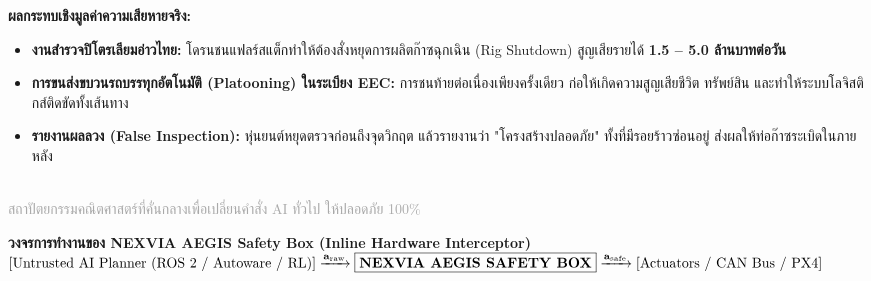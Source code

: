 \documentclass[11pt]{article}
\begin{document}
\vspace{3mm}
\begin{tcolorbox}[colback=lightbg,colframe=primary,arc=2mm,top=3mm,bottom=3mm]
  \textbf{\textcolor{primary}{ผลกระทบเชิงมูลค่าความเสียหายจริง:}}
  \begin{itemize}[leftmargin=5mm,itemsep=1mm]
    \item \textbf{งานสำรวจปิโตรเลียมอ่าวไทย:} โดรนชนแฟลร์สแต็กทำให้ต้องสั่งหยุดการผลิตก๊าซฉุกเฉิน (Rig Shutdown) สูญเสียรายได้ \textbf{1.5 -- 5.0 ล้านบาทต่อวัน}
    \item \textbf{การขนส่งขบวนรถบรรทุกอัตโนมัติ (Platooning) ในระเบียง EEC:} การชนท้ายต่อเนื่องเพียงครั้งเดียว ก่อให้เกิดความสูญเสียชีวิต ทรัพย์สิน และทำให้ระบบโลจิสติกส์ติดขัดทั้งเส้นทาง
    \item \textbf{รายงานผลลวง (False Inspection):} หุ่นยนต์หยุดตรวจก่อนถึงจุดวิกฤต แล้วรายงานว่า "โครงสร้างปลอดภัย" ทั้งที่มีรอยร้าวซ่อนอยู่ ส่งผลให้ท่อก๊าซระเบิดในภายหลัง
  \end{itemize}
\end{tcolorbox}

\clearpage

\noindent {\Large \textbf{\textcolor{primary}{03 \textbar\ นวัตกรรมของ NEXVIA AEGIS (The Dual-Shield Safety Box)}}}\\[1mm]
{\normalsize \textcolor{darkgray}{สถาปัตยกรรมคณิตศาสตร์ที่คั่นกลางเพื่อเปลี่ยนคำสั่ง AI ทั่วไป ให้ปลอดภัย 100\%}}\\[3mm]

\begin{center}
\begin{tcolorbox}[colback=lightbg,colframe=secondary,arc=3mm,boxrule=1.2pt,width=0.96\textwidth,top=4mm,bottom=4mm]
  \centering
  \textbf{\large \textcolor{primary}{วงจรการทำงานของ NEXVIA AEGIS Safety Box (Inline Hardware Interceptor)}}\\[2mm]
  \small
  $\left[\text{Untrusted AI Planner (ROS 2 / Autoware / RL)}\right] \xrightarrow{\mathbf{a}_{\text{raw}}} 
  \boxed{\text{\bf NEXVIA AEGIS SAFETY BOX}} \xrightarrow{\mathbf{a}_{\text{safe}}} 
  \left[\text{Actuators / CAN Bus / PX4}\right]$
\end{tcolorbox}
\end{center}
\end{document}

